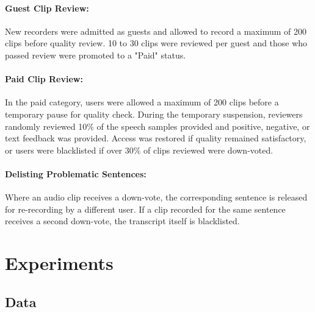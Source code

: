 \documentclass[11pt,a4paper]{article}
\begin{document}
 \paragraph{Guest Clip Review:} New recorders were admitted as guests and allowed to record a maximum of 200 clips before quality review. 10 to 30 clips were reviewed per guest and those who passed review were promoted to a "Paid" status. %


 \paragraph{Paid Clip Review:} In the paid category, users were allowed a maximum of 200 clips before a temporary pause for quality check. During the temporary suspension, reviewers randomly reviewed 10\% of the speech samples provided and positive, negative, or text feedback was provided. Access was restored if quality remained satisfactory, or users were blacklisted if over 30\% of clips reviewed were down-voted.
 
 
 \paragraph{Delisting Problematic Sentences:}  Where an audio clip receives a down-vote, the corresponding sentence is released for re-recording by a different user. If a clip recorded for the same sentence receives a second down-vote, the transcript itself is blacklisted.


\section{Experiments}

\subsection{Data}
\end{document}

